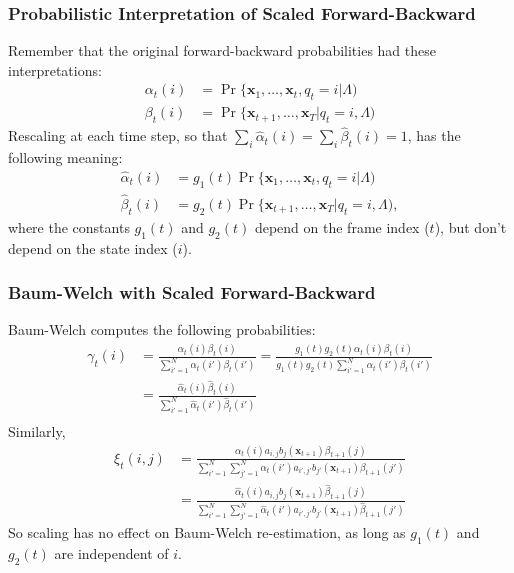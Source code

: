 \documentclass{beamer}
\begin{document}
\begin{frame}
  \frametitle{Probabilistic Interpretation of Scaled Forward-Backward}

  Remember that the original forward-backward probabilities had these interpretations:
  \begin{align*}
    \alpha_t(i) &= \Pr\{\mathbf{x}_1,\ldots,\mathbf{x}_t,q_t=i|\Lambda)\\
    \beta_t(i) &= \Pr\{\mathbf{x}_{t+1},\ldots,\mathbf{x}_T|q_t=i,\Lambda)
  \end{align*}
  Rescaling at each time step, so that
  $\sum_i\hat\alpha_t(i)=\sum_i\hat\beta_t(i)=1$, has the following
  meaning:
  \begin{align*}
    \hat\alpha_t(i) &= g_1(t)\Pr\{\mathbf{x}_1,\ldots,\mathbf{x}_t,q_t=i|\Lambda)\\
    \hat\beta_t(i) &= g_2(t)\Pr\{\mathbf{x}_{t+1},\ldots,\mathbf{x}_T|q_t=i,\Lambda),
  \end{align*}
  where the constants $g_1(t)$ and $g_2(t)$ depend on the frame index
  ($t$), but don't depend on the state index ($i$).
\end{frame}


\begin{frame}
  \frametitle{Baum-Welch with Scaled Forward-Backward}

  Baum-Welch computes the following probabilities:
  \begin{align*}
    \gamma_t(i) &= \frac{\alpha_t(i)\beta_t(i)}{\sum_{i'=1}^N\alpha_t(i')\beta_t(i')}
    = \frac{g_1(t)g_2(t)\alpha_t(i)\beta_t(i)}{g_1(t)g_2(t)\sum_{i'=1}^N\alpha_t(i')\beta_t(i')}\\
    &= \frac{\hat\alpha_t(i)\hat\beta_t(i)}{\sum_{i'=1}^N\hat\alpha_t(i')\hat\beta_t(i')}\\
  \end{align*}
  Similarly,
  \begin{align*}
    \xi_t(i,j)
    &=\frac{\alpha_t(i)a_{i,j}b_j(\mathbf{x}_{t+1})\beta_{t+1}(j)}{\sum_{i'=1}^N\sum_{j'=1}^N\alpha_t(i')a_{i',j'}b_{j'}(\mathbf{x}_{t+1})\beta_{t+1}(j')}\\
    &=\frac{\hat\alpha_t(i)a_{i,j}b_j(\mathbf{x}_{t+1})\hat\beta_{t+1}(j)}{\sum_{i'=1}^N\sum_{j'=1}^N\hat\alpha_t(i')a_{i',j'}b_{j'}(\mathbf{x}_{t+1})\hat\beta_{t+1}(j')}
  \end{align*}
  So scaling has no effect on Baum-Welch re-estimation, as long as
  $g_1(t)$ and $g_2(t)$ are independent of $i$.
\end{frame}
\end{document}
